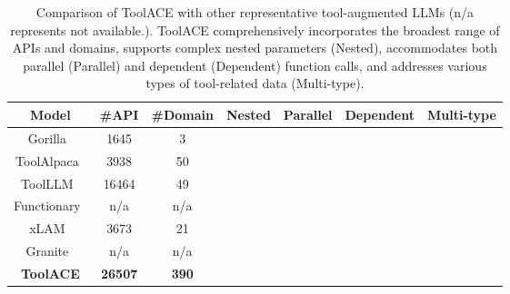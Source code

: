 \documentclass{article}
\newcommand{\cmark}{\textcolor{green}{\ding{51}}} %
\newcommand{\xmark}{\textcolor{red}{\ding{55}}} %
\begin{document}

\begin{table}[t!]
\centering
\small
\begin{threeparttable}
\caption{Comparison of ToolACE with other representative tool-augmented LLMs (n/a represents not available.). ToolACE comprehensively incorporates the broadest range of APIs and domains, supports complex nested parameters (Nested), accommodates both parallel (Parallel) and dependent (Dependent) function calls, and addresses various types of tool-related data (Multi-type).}
\label{table:comparison}
\vspace{-0.4cm}
\begin{tabular}{ccccccc}
\toprule
Model      & \#API & \#Domain & Nested & Parallel & Dependent & Multi-type \\\midrule
Gorilla~\cite{patil2023gorilla}    & 1645  & 3        & \xmark         & \xmark           &  \xmark              & \xmark        \\
ToolAlpaca~\cite{tang2023toolalpaca} & 3938  & 50       & \xmark         & \xmark          & \xmark             & \xmark         \\
ToolLLM~\cite{qin2023toolllm}    & 16464 & 49   & \xmark    & \xmark         &  \cmark                     & \xmark           \\
Functionary~\cite{functionarymeetkai}    & n/a  & n/a    & \xmark    & \cmark         &  \xmark                     & \xmark           \\
xLAM~\cite{liu2024apigen}       & 3673  & 21    & \xmark   & \cmark         &  \xmark                     & \xmark           \\
Granite~\cite{abdelaziz2024granite}       & n/a  & n/a     & \xmark   & \cmark         &  \xmark                     & \cmark           \\
\textbf{ToolACE} & \textbf{26507} & \textbf{390} & \cmark & \cmark & \cmark & \cmark\\\bottomrule
\end{tabular}
\end{threeparttable}
\end{table}
\end{document}
